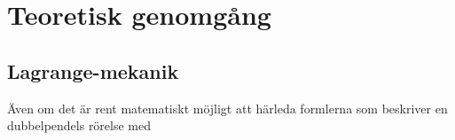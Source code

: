 

\section{Teoretisk genomgång}
\subsection{Lagrange-mekanik}
Även om det är rent matematiskt möjligt att härleda formlerna som beskriver en dubbelpendels rörelse med 